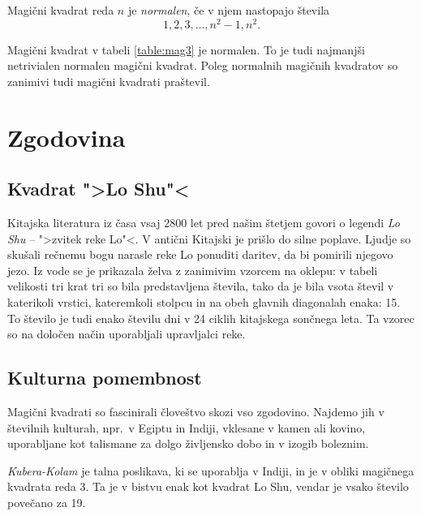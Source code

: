 \documentclass[a4paper,12pt]{article}
\begin{document}
\begin{Definicija}
   Magični kvadrat reda \(n\) je \emph{normalen}, če v njem nastopajo števila
   \begin{equation}
      \label{eq:numbers}
      1, 2, 3, \ldots, n^2-1, n^2.
   \end{equation}
\end{Definicija}

Magični kvadrat v tabeli \ref{table:mag3} je normalen.
To je tudi najmanjši netrivialen normalen magični kvadrat.
Poleg normalnih magičnih kvadratov so zanimivi tudi magični kvadrati praštevil. %


\section{Zgodovina}

\subsection{Kvadrat ">Lo Shu"<}

Kitajska literatura iz časa vsaj 2800 let pred našim štetjem govori o legendi
\emph{Lo Shu} -- ">zvitek reke Lo"<. V antični Kitajski je prišlo do
silne poplave. Ljudje so skušali rečnemu bogu narasle reke Lo ponuditi daritev,
da bi pomirili njegovo jezo. Iz vode se je prikazala želva z zanimivim vzorcem
na oklepu: v tabeli velikosti tri krat tri so bila predstavljena števila, tako
da je bila vsota števil v katerikoli vrstici, kateremkoli stolpcu in na obeh
glavnih diagonalah enaka: 15. To število je tudi enako številu dni v 24 ciklih
kitajskega sončnega leta. Ta vzorec so na določen način uporabljali upravljalci
reke.


\subsection{Kulturna pomembnost}

Magični kvadrati so fascinirali človeštvo skozi vso zgodovino. Najdemo jih
v številnih kulturah, npr.\ v Egiptu in Indiji, vklesane v kamen ali
kovino, uporabljane kot talismane za dolgo življensko dobo in v
izogib boleznim.

\emph{Kubera-Kolam} je talna poslikava, ki se uporablja v Indiji, in je v
obliki magičnega kvadrata reda 3. Ta je v bistvu enak kot kvadrat
Lo Shu, vendar je vsako število povečano za 19.
\end{document}
